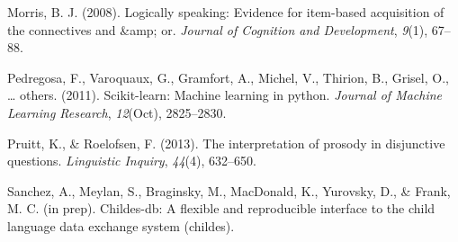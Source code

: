 \documentclass[10pt, letterpaper]{article}
\begin{document}
\hypertarget{ref-morris2008logically}{}
Morris, B. J. (2008). Logically speaking: Evidence for item-based
acquisition of the connectives and \&amp; or. \emph{Journal of Cognition
and Development}, \emph{9}(1), 67--88.

\hypertarget{ref-pedregosa2011scikit}{}
Pedregosa, F., Varoquaux, G., Gramfort, A., Michel, V., Thirion, B.,
Grisel, O., \ldots{} others. (2011). Scikit-learn: Machine learning in
python. \emph{Journal of Machine Learning Research}, \emph{12}(Oct),
2825--2830.

\hypertarget{ref-pruitt2013interpretation}{}
Pruitt, K., \& Roelofsen, F. (2013). The interpretation of prosody in
disjunctive questions. \emph{Linguistic Inquiry}, \emph{44}(4),
632--650.

\hypertarget{ref-childesdb}{}
Sanchez, A., Meylan, S., Braginsky, M., MacDonald, K., Yurovsky, D., \&
Frank, M. C. (in prep). Childes-db: A flexible and reproducible
interface to the child language data exchange system (childes).
\end{document}
